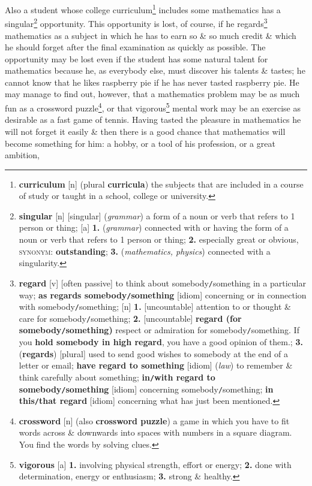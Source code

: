 \documentclass[oneside]{book}
\numberwithin{equation}{section}
\begin{document}
Also a student whose college curriculum\footnote{\textbf{curriculum} [n] (plural \textbf{curricula}) the subjects that are included in a course of study or taught in a school, college or university.} includes some mathematics has a singular\footnote{\textbf{singular} [n] [singular] (\textit{grammar}) a form of a noun or verb that refers to 1 person or thing; [a] \textbf{1.} (\textit{grammar}) connected with or having the form of a noun or verb that refers to 1 person or thing; \textbf{2.} especially great or obvious, \textsc{synonym}: \textbf{outstanding}; \textbf{3.} (\textit{mathematics, physics}) connected with a singularity.} opportunity. This opportunity is lost, of course, if he regards\footnote{\textbf{regard} [v] [often passive] to think about somebody\texttt{/}something in a particular way; \textbf{as regards somebody\texttt{/}something} [idiom] concerning or in connection with somebody\texttt{/}something; [n] \textbf{1.} [uncountable] attention to or thought \& care for somebody\texttt{/}something; \textbf{2.} [uncountable] \textbf{regard (for somebody\texttt{/}something)} respect or admiration for somebody\texttt{/}something. If you \textbf{hold somebody in high regard}, you have a good opinion of them.; \textbf{3.} (\textbf{regards}) [plural] used to send good wishes to somebody at the end of a letter or email; \textbf{have regard to something} [idiom] (\textit{law}) to remember \& think carefully about something; \textbf{in\texttt{/}with regard to somebody\texttt{/}something} [idiom] concerning somebody\texttt{/}something; \textbf{in this\texttt{/}that regard} [idiom] concerning what has just been mentioned.} mathematics as a subject in which he has to earn so \& so much credit \& which he should forget after the final examination as quickly as possible. The opportunity may be lost even if the student has some natural talent for mathematics because he, as everybody else, must discover his talents \& tastes; he cannot know that he likes raspberry pie if he has never tasted raspberry pie. He may manage to find out, however, that a mathematics problem may be as much fun as a crossword puzzle\footnote{\textbf{crossword} [n] (also \textbf{crossword puzzle}) a game in which you have to fit words across \& downwards into spaces with numbers in a square diagram. You find the words by solving clues.}, or that vigorous\footnote{\textbf{vigorous} [a] \textbf{1.} involving physical strength, effort or energy; \textbf{2.} done with determination, energy or enthusiasm; \textbf{3.} strong \& healthy.} mental work may be an exercise as desirable as a fast game of tennis. Having tasted the pleasure in mathematics he will not forget it easily \& then there is a good chance that mathematics will become something for him: a hobby, or a tool of his profession, or a great ambition,
\end{document}
